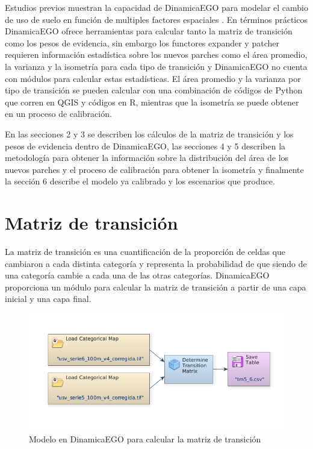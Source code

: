 \documentclass[12pt,a4paper,oldfontcommands]{article}
\begin{document}
Estudios previos muestran la capacidad de DinamicaEGO para modelar el cambio de uso de suelo en función de multiples factores espaciales \parencite{cheng_land_2020, wei_2012}. En términos prácticos DinamicaEGO ofrece herramientas para calcular tanto la matriz de transición como los pesos de evidencia, sin embargo los functores expander y patcher requieren información estadística sobre los nuevos parches como el área promedio, la varianza y la isometría para cada tipo de transición y DinamicaEGO no cuenta con módulos para calcular estas estadísticas. El área promedio y la varianza por tipo de transición se pueden calcular con una combinación de códigos de Python que corren en QGIS y códigos en R, mientras que la isometría se puede obtener en un proceso de calibración.

En las secciones 2 y 3 se describen los cálculos de la matriz de transición y los pesos de evidencia dentro de DinamicaEGO, las secciones 4 y 5 describen la metodología para obtener la información sobre la distribución del área de los nuevos parches y el proceso de calibración para obtener la isometría y finalmente la sección 6 describe el modelo ya calibrado y los escenarios que produce.





\section{Matriz de transición}
La matriz de transición es una cuantificación de la proporción de celdas que cambiaron a cada distinta categoría y representa la probabilidad de que siendo de una categoría cambie a cada una de las otras categorías. DinamicaEGO proporciona un módulo para calcular la matriz de transición a partir de una capa inicial y una capa final.

\begin{figure}[h]
	\centering
	\includegraphics[width=1\textwidth]{./figuras/modelo_matriz.png}
	\caption{Modelo en DinamicaEGO para calcular la matriz de transición}
\end{figure}
\label{fig:modelo_matriz}
\bigskip
\end{document}

